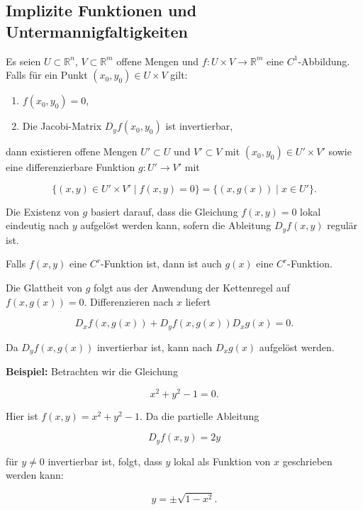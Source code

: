 \subsection{Implizite Funktionen und Untermannigfaltigkeiten}

\begin{satz}{}
Es seien $ U \subset \mathbb{R}^n $, $ V \subset \mathbb{R}^m $ offene Mengen und $ f: U \times V \to \mathbb{R}^m $ eine $ C^1 $-Abbildung. Falls für ein Punkt $ (x_0, y_0) \in U \times V $ gilt:
\begin{enumerate}
    \item $ f(x_0, y_0) = 0 $,
    \item Die Jacobi-Matrix $ D_y f(x_0, y_0) $ ist invertierbar,
\end{enumerate}
dann existieren offene Mengen $ U' \subset U $ und $ V' \subset V $ mit $ (x_0, y_0) \in U' \times V' $ sowie eine differenzierbare Funktion $ g: U' \to V' $ mit


$$
\{(x,y) \in U' \times V' \mid f(x,y) = 0 \} = \{(x, g(x)) \mid x \in U' \}.
$$


\end{satz}

\begin{bemerkungbox}
Die Existenz von $ g $ basiert darauf, dass die Gleichung $ f(x,y) = 0 $ lokal eindeutig nach $ y $ aufgelöst werden kann, sofern die Ableitung $ D_y f(x,y) $ regulär ist.
\end{bemerkungbox}

\begin{korollar}
Falls $ f(x,y) $ eine $ C^r $-Funktion ist, dann ist auch $ g(x) $ eine $ C^r $-Funktion.
\end{korollar}

\begin{beweisbox}
Die Glattheit von $ g $ folgt aus der Anwendung der Kettenregel auf $ f(x,g(x)) = 0 $. Differenzieren nach $ x $ liefert


$$
D_x f(x, g(x)) + D_y f(x, g(x)) D_x g(x) = 0.
$$


Da $ D_y f(x, g(x)) $ invertierbar ist, kann nach $ D_x g(x) $ aufgelöst werden.
\end{beweisbox}

\begin{beispielbox}
\textbf{Beispiel:}  
Betrachten wir die Gleichung


$$
x^2 + y^2 - 1 = 0.
$$


Hier ist $ f(x,y) = x^2 + y^2 - 1 $. Da die partielle Ableitung


$$
D_y f(x,y) = 2y
$$


für $ y \neq 0 $ invertierbar ist, folgt, dass $ y $ lokal als Funktion von $ x $ geschrieben werden kann: 


$$
y = \pm \sqrt{1 - x^2}.
$$


\end{beispielbox}
